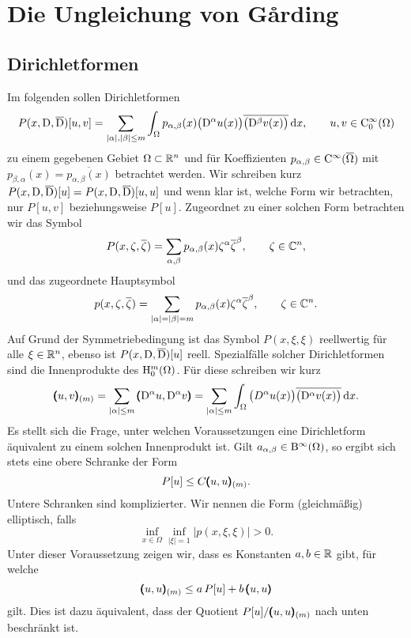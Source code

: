 \chapter{Die Ungleichung von G\r{a}rding}

\section{Dirichletformen}
Im folgenden sollen Dirichletformen 
\begin{equation}
   P(x,\mathrm D,\overline{\mathrm D})[u,v] = \sum_{|\alpha|,|\beta|\le m} \int_\Omega p_{\alpha,\beta}(x) \big(\mathrm D^\alpha u(x)\big) \overline{\big(\mathrm D^\beta v(x)\big)} \,\mathrm d x,\qquad u,v\in\mathrm C_0^\infty(\Omega)
\end{equation}
zu einem gegebenen Gebiet $\Omega\subset\mathbb R^n$ und für Koeffizienten $p_{\alpha,\beta}\in\mathrm C^\infty(\overline{\Omega})$ mit $p_{\beta,\alpha}(x)=\overline{p_{\alpha,\beta}(x)}$  betrachtet werden. Wir schreiben kurz $P(x,\mathrm D,\overline{\mathrm D})[u]=P(x,\mathrm D,\overline{\mathrm D})[u,u]$ und wenn klar ist, welche Form wir betrachten, nur $P[u,v]$ beziehungsweise $P[u]$. Zugeordnet zu einer solchen Form betrachten wir das Symbol
\begin{equation}
   P(x,\zeta,\overline\zeta) = \sum_{\alpha,\beta} p_{\alpha,\beta}(x) \zeta^\alpha\overline\zeta^\beta,\qquad \zeta\in\mathbb C^n,
\end{equation}
und das zugeordnete Hauptsymbol
\begin{equation}
   p(x,\zeta,\overline\zeta) = \sum_{|\alpha|=|\beta|=m} p_{\alpha,\beta}(x) \zeta^\alpha\overline\zeta^\beta,\qquad \zeta\in\mathbb C^n.
\end{equation}
Auf Grund der Symmetriebedingung ist das Symbol $P(x,\xi,\xi)$ reellwertig f\"ur alle $\xi\in\mathbb R^n$, ebenso ist 
$P(x,\mathrm D,\overline {\mathrm D})[u]$ reell. Spezialfälle solcher Dirichletformen sind die Innenprodukte des $\mathrm H^m_0(\Omega)$. Für diese schreiben wir kurz
\begin{equation}
  \pmb(u,v\pmb)_{(m)} = \sum_{|\alpha|\le m} \pmb(\mathrm D^\alpha u,\mathrm D^\alpha v\pmb) = \sum_{|\alpha|\le m} \int_\Omega   \big(D^\alpha u(x)\big) \overline{\big(\mathrm D^\alpha v(x)\big)} \,\mathrm d x.
\end{equation}
Es stellt sich die Frage, unter welchen Voraussetzungen eine Dirichletform äquivalent zu einem solchen Innenprodukt ist. Gilt $a_{\alpha,\beta}\in \mathrm B^\infty(\Omega)$, so ergibt sich stets eine obere Schranke der Form
\begin{equation}
    P[u] \le C \pmb(u,u\pmb)_{(m)}.
\end{equation}
Untere Schranken sind komplizierter. Wir nennen die Form (gleichmäßig) elliptisch, falls 
\begin{equation}
  \inf_{x\in\Omega}  \inf_{|\xi|=1} |p(x,\xi,\xi)| > 0.
\end{equation}
Unter dieser Voraussetzung zeigen wir, dass es Konstanten $a,b\in\mathbb R$ gibt, für welche
\begin{equation} 
   \pmb(u,u\pmb)_{(m)} \le a\, P[u] + b\, \pmb(u,u\pmb)
\end{equation}
gilt. Dies ist dazu äquivalent, dass der Quotient $P [u]  / \pmb(u,u\pmb)_{(m)}$ nach unten beschränkt ist.


